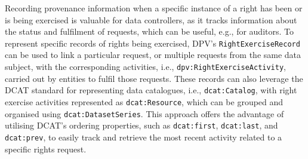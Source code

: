 \documentclass{IOS-Book-Article}     %
\begin{document}
Recording provenance information when a specific instance of a right has been or is being exercised is valuable for data controllers, as it tracks information about the status and fulfilment of requests, which can be useful, e.g., for auditors.
To represent specific records of rights being exercised, DPV's \texttt{RightExerciseRecord} can be used to link a particular request, or multiple requests from the same data subject, with the corresponding activities, i.e., \texttt{dpv:RightExerciseActivity}, carried out by entities to fulfil those requests.
These records can also leverage the DCAT standard for representing data catalogues, i.e., \texttt{dcat:Catalog}, with right exercise activities represented as \texttt{dcat:Resource}, which can be grouped and organised using \texttt{dcat:DatasetSeries}.
This approach offers the advantage of utilising DCAT's ordering properties, such as \texttt{dcat:first}, \texttt{dcat:last}, and \texttt{dcat:prev}, to easily track and retrieve the most recent activity related to a specific rights request.

\end{document}
